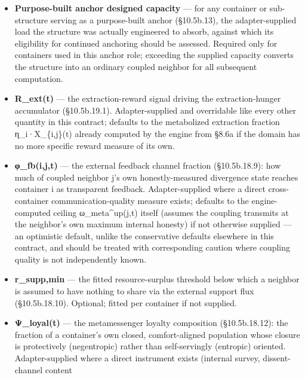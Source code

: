 \documentclass[
]{article}
\begin{document}
\begin{itemize}
  an equivalent domain-specific proxy). Optional; each defaults to 1 if
  not supplied, which assumes the low-entropy baseline configuration and
  therefore understates hazard in a container that is actually in either
  non-baseline regime --- the same conservative-default failure mode
  already flagged for χ\_supp, and worth the same caution here.
\item
  \textbf{Purpose-built anchor designed capacity} --- for any container
  or sub-structure serving as a purpose-built anchor (§10.5b.13), the
  adapter-supplied load the structure was actually engineered to absorb,
  against which its eligibility for continued anchoring should be
  assessed. Required only for containers used in this anchor role;
  exceeding the supplied capacity converts the structure into an
  ordinary coupled neighbor for all subsequent computation.
\item
  \textbf{R\_ext(t)} --- the extraction-reward signal driving the
  extraction-hunger accumulator (§10.5b.19.1). Adapter-supplied and
  overridable like every other quantity in this contract; defaults to
  the metabolized extraction fraction η\_i·X\_\{i,j\}(t) already
  computed by the engine from §8.6a if the domain has no more specific
  reward measure of its own.
\item
  \textbf{φ\_fb(i,j,t)} --- the external feedback channel fraction
  (§10.5b.18.9): how much of coupled neighbor j's own honestly-measured
  divergence state reaches container i as transparent feedback.
  Adapter-supplied where a direct cross-container communication-quality
  measure exists; defaults to the engine-computed ceiling
  ω\_meta\^{}up(j,t) itself (assumes the coupling transmits at the
  neighbor's own maximum internal honesty) if not otherwise supplied ---
  an optimistic default, unlike the conservative defaults elsewhere in
  this contract, and should be treated with corresponding caution where
  coupling quality is not independently known.
\item
  \textbf{r\_supp,min} --- the fitted resource-surplus threshold below
  which a neighbor is assumed to have nothing to share via the external
  support flux (§10.5b.18.10). Optional; fitted per container if not
  supplied.
\item
  \textbf{Ψ\_loyal(t)} --- the metamessenger loyalty composition
  (§10.5b.18.12): the fraction of a container's own closed,
  comfort-aligned population whose closure is protectively (negentropic)
  rather than self-servingly (entropic) oriented. Adapter-supplied where
  a direct instrument exists (internal survey, dissent-channel content

\end{itemize}
\end{document}
